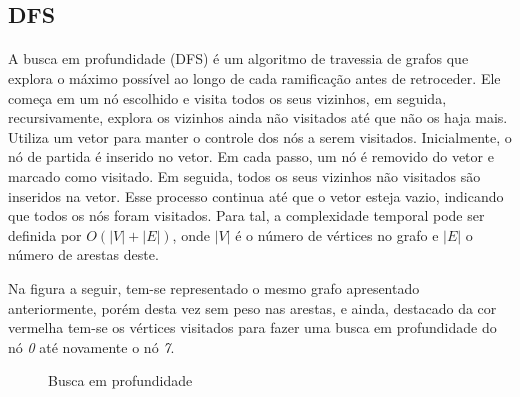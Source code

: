 \documentclass{article}
\begin{document}
				\subsection{DFS}
					\paragraph{} A busca em profundidade (DFS) é um algoritmo de travessia de grafos que explora o máximo possível ao longo de cada ramificação antes de retroceder. Ele começa em um nó escolhido e visita todos os seus vizinhos, em seguida, recursivamente, explora os vizinhos ainda não visitados até que não os haja mais. Utiliza um vetor para manter o controle dos nós a serem visitados. Inicialmente, o nó de partida é inserido no vetor. Em cada passo, um nó é removido do vetor e marcado como visitado. Em seguida, todos os seus vizinhos não visitados são inseridos na vetor. Esse processo continua até que o vetor esteja vazio, indicando que todos os nós foram visitados. Para tal, a complexidade temporal pode ser definida por $O(|V| + |E|)$, onde $|V|$ é o número de vértices no grafo e $|E|$ o número de arestas deste.
					\par{} Na figura a seguir, tem-se representado o mesmo grafo apresentado anteriormente, porém desta vez sem peso nas arestas, e ainda, destacado da cor vermelha tem-se os vértices visitados para fazer uma busca em profundidade do nó {\it 0} até novamente o nó {\it 7}.
					\begin{figure}[H]
						\centering
						
						\caption{Busca em profundidade}
						\label{fig:DFS}
					\end{figure}
\end{document}
